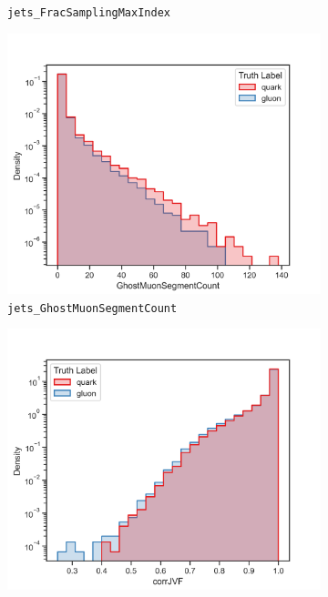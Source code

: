 \begin{figure}[!htb]
\begin{subfigure}[t]{0.48\textwidth}
		\caption{\texttt{jets\_FracSamplingMaxIndex}}
		\label{fig:highlevel_7}
	\end{subfigure}
	\begin{subfigure}[t]{0.48\textwidth}
		\includegraphics[width=1\textwidth]{src/plots/distributions/highlevel/jets_GhostMuonSegmentCount.png}
		\caption{\texttt{jets\_GhostMuonSegmentCount}}
		\label{fig:highlevel_8}
	\end{subfigure}
	\begin{subfigure}[t]{0.48\textwidth}
		\includegraphics[width=1\textwidth]{src/plots/distributions/highlevel/jets_JVFCorr.png}

\end{subfigure}
\end{figure}
